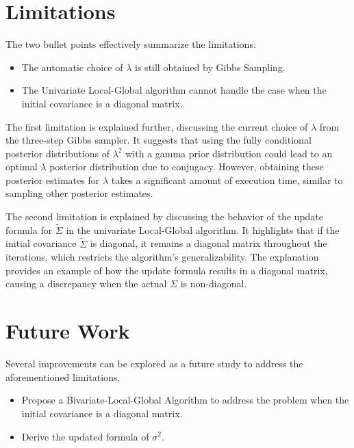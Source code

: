 %
%


\label{Chapter5}
\section{Limitations}
The two bullet points effectively summarize the limitations:

\begin{itemize}
    \item The automatic choice of $\lambda$ is still obtained by Gibbs Sampling.
    \item The Univariate Local-Global algorithm cannot handle the case when the initial covariance is a diagonal matrix.
\end{itemize}
The first limitation is explained further, discussing the current choice of $\lambda$ from the three-step Gibbs sampler. It suggests that using the fully conditional posterior distributions of $\lambda^2$ with a gamma prior distribution could lead to an optimal $\lambda$ posterior distribution due to conjugacy. However, obtaining these posterior estimates for $\lambda$ takes a significant amount of execution time, similar to sampling other posterior estimates.

The second limitation is explained by discussing the behavior of the update formula for $\tilde{\Sigma}$ in the univariate Local-Global algorithm. It highlights that if the initial covariance $\tilde{\Sigma}$ is diagonal, it remains a diagonal matrix throughout the iterations, which restricts the algorithm's generalizability. The explanation provides an example of how the update formula results in a diagonal matrix, causing a discrepancy when the actual $\Sigma$ is non-diagonal.

\section{Future Work}
Several improvements can be explored as a future study to address the aforementioned limitations.
\begin{itemize}
	\item Propose a Bivariate-Local-Global Algorithm to address the problem when the initial covariance is a diagonal matrix.
	\item Derive the updated formula of $\sigma^2$.
\end{itemize}

